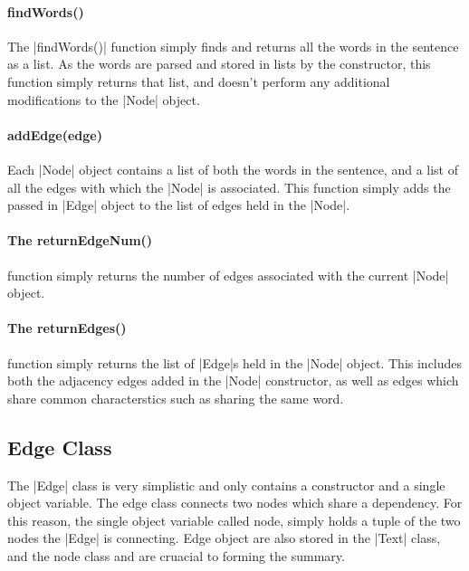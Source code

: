 	\paragraph{findWords()}
	The |findWords()| function simply finds and returns all the words in the sentence as a list. As the words are parsed and stored in lists by the constructor, this function simply returns that list, and doesn't perform any additional modifications to the |Node| object.
	
	\paragraph{addEdge(edge)}	
	Each |Node| object contains a list of both the words in the sentence, and a list of all the edges with which the |Node| is associated. This function simply adds the passed in |Edge| object to the list of edges held in the |Node|.
	
	\paragraph{The returnEdgeNum()}
	function simply returns the number of edges associated with the current |Node| object.
	
	\paragraph{The returnEdges()}
	function simply returns the list of |Edge|s held in the |Node| object. This includes both the adjacency edges added in the |Node| constructor, as well as edges which share common characterstics such as sharing the same word.
		
\subsection{Edge Class}
	
	The |Edge| class is very simplistic and only contains a constructor and a single object variable. The edge class connects two nodes which share a dependency. For this reason, the single object variable called node, simply holds a tuple of the two nodes the |Edge| is connecting. Edge object are also stored in the |Text| class, and the node class and are cruacial to forming the summary.
	
